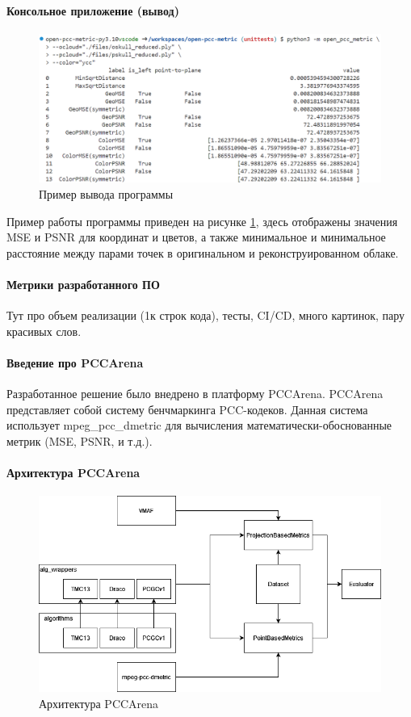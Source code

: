 \documentclass[a4paper,12pt]{extreport}
\begin{document}
\paragraph{Консольное приложение (вывод)}

\begin{figure}[H]
    \centering
    \includegraphics[width=0.7\linewidth]{assets/open_pcc_metric_output.png}
    \caption{Пример вывода программы}
    \label{img:pcc_metric_output}
\end{figure}

Пример работы программы приведен на рисунке \ref{img:pcc_metric_output}, здесь
отображены значения MSE и PSNR для координат и цветов, а также минимальное и
минимальное расстояние между парами точек в оригинальном и реконструированном
облаке.

\paragraph{Метрики разработанного ПО}

Тут про объем реализации (1к строк кода), тесты, CI/CD, много картинок, пару
красивых слов.

\paragraph{Введение про PCCArena}

Разработанное решение было внедрено в платформу PCCArena. PCCArena представляет
собой систему бенчмаркинга PCC-кодеков. Данная система использует
mpeg\_pcc\_dmetric для вычисления математически-обоснованные метрик (MSE, PSNR,
и т.д.).

\paragraph{Архитектура PCCArena}

\begin{figure}[H]
    \centering
    \includegraphics[width=0.7\linewidth]{assets/pcc_arena_architecture.png}
    \caption{Архитектура PCCArena}
    \label{img:pcc_arena_architecture}
\end{figure}
\end{document}
